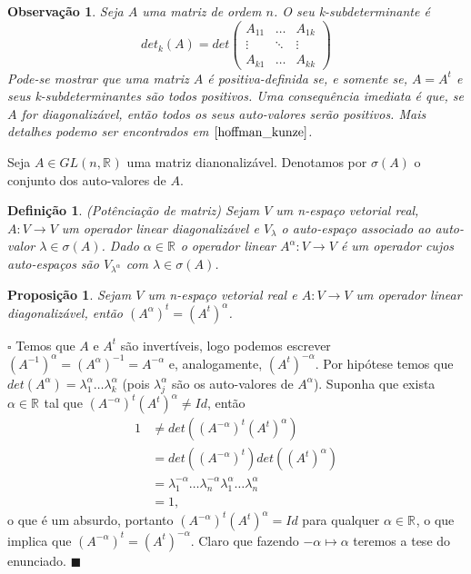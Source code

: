 \documentclass[12pt]{book}
\newtheorem{definicao}[teorema]{Definição}
\newtheorem{observacao}[teorema]{Observação}
\newtheorem{proposicao}[teorema]{Proposição}
\newenvironment{prova}[1]{$\square$ #1}{\hfill$\blacksquare$}
\newcommand{\generalgroup}[2]{GL(#1, #2)}
\newcommand{\generalgroupreal}[1]{\generalgroup{#1}{\real{}}}
\newcommand{\real}[1]{\mathbb{R}^{#1}}
\begin{document}
	\begin{observacao}\label{observacao_matriz_positiva_definida}
		Seja $A$ uma matriz de ordem $n$. O seu k-subdeterminante é
		$$
		det_{k}(A) =
		det \left(
		\begin{array}{ccc}
		A_{11} & \dots & A_{1k}
		\\
		\vdots & \ddots & \vdots
		\\
		A_{k1} & \dots & A_{kk}
		\end{array}
		\right)
		$$
		Pode-se mostrar que uma matriz $A$ é positiva-definida se, e somente se, $A=A^{t}$ e seus k-subdeterminantes são todos positivos. Uma consequência imediata é que, se $A$ for diagonalizável, então todos os seus auto-valores serão positivos. Mais detalhes podemo ser encontrados em $\cite{hoffman_kunze}$.
	\end{observacao}

	Seja $A \in \generalgroupreal{n}$ uma matriz dianonalizável. Denotamos por $\sigma(A)$ o conjunto dos auto-valores de $A$.

	\begin{definicao}\label{definicao_potenciacao_matriz}
		(Potênciação de matriz) Sejam $V$ um n-espaço vetorial real, $A:V \to V$ um operador linear diagonalizável e $V_{\lambda}$ o auto-espaço associado ao auto-valor $\lambda \in \sigma(A)$. Dado $\alpha \in \real{}$ o operador linear $A^{\alpha}:V \to V$ é um operador cujos auto-espaços são $V_{\lambda^{\alpha}}$ com $\lambda \in \sigma(A)$.
	\end{definicao}
	
	\begin{proposicao}\label{proposicao_transposta_potenciacao_matriz}
		Sejam $V$ um n-espaço vetorial real e $A:V\to V$ um operador linear diagonalizável, então $(A^{\alpha})^{t}=(A^{t})^{\alpha}$.
	\end{proposicao}
	\begin{prova}
		Temos que $A$ e $A^{t}$ são invertíveis, logo podemos escrever $(A^{-1})^{\alpha}=(A^{\alpha})^{-1}=A^{-\alpha}$ e, analogamente, $(A^{t})^{-\alpha}$. Por hipótese temos que $det(A^{\alpha}) = \lambda_{1}^{\alpha} \dots \lambda_{k}^{\alpha}$ (pois $\lambda_{j}^{\alpha}$ são os auto-valores de $A^{\alpha}$). Suponha que exista $\alpha \in \real{}$ tal que $(A^{-\alpha})^{t}(A^{t})^{\alpha} \neq Id$, então 
		$$
		\begin{aligned}
		1 &\neq det((A^{-\alpha})^{t}(A^{t})^{\alpha}) 
		\\
		&= det((A^{-\alpha})^{t})det((A^{t})^{\alpha})
		\\
		&= \lambda_{1}^{-\alpha} \dots \lambda_{n}^{-\alpha}\lambda_{1}^{\alpha} \dots \lambda_{n}^{\alpha}
		\\
		&=1,
		\end{aligned}
		$$
			o que é um absurdo, portanto $(A^{-\alpha})^{t}(A^{t})^{\alpha} =Id$ para qualquer $\alpha \in \real{}$, o que implica que $(A^{-\alpha})^{t}=(A^{t})^{-\alpha}$. Claro que fazendo $-\alpha \mapsto \alpha$ teremos a tese do enunciado.
	\end{prova}
	
\end{document}
